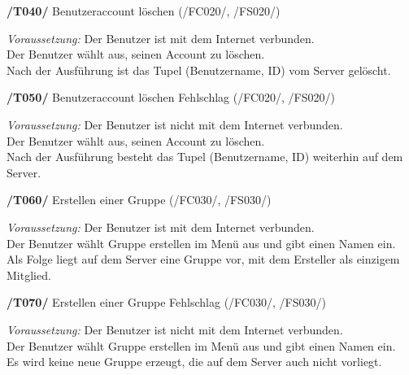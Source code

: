 \textbf{/T040/} Benutzeraccount löschen (/FC020/, /FS020/) \\
\begin{center}
\vspace{-\parskip}
\begin{minipage}[t]{0.9\textwidth}
\emph{Voraussetzung:} Der Benutzer ist mit dem Internet verbunden.               \\
Der Benutzer wählt aus, seinen Account zu löschen.                         \\
Nach der Ausführung ist das Tupel (Benutzername, ID) vom Server gelöscht.   \\
\end{minipage}
\end{center}

\textbf{/T050/} Benutzeraccount löschen Fehlschlag (/FC020/, /FS020/) \\
\begin{center}
\vspace{-\parskip}
\begin{minipage}[t]{0.9\textwidth}
\emph{Voraussetzung:} Der Benutzer ist nicht mit dem Internet verbunden.            \\
Der Benutzer wählt aus, seinen Account zu löschen.                            \\
Nach der Ausführung besteht das Tupel (Benutzername, ID) weiterhin auf dem Server.\\
\end{minipage}
\end{center}

\textbf{/T060/} Erstellen einer Gruppe (/FC030/, /FS030/)\\
\begin{center}
\vspace{-\parskip}
\begin{minipage}[t]{0.9\textwidth}
\emph{Voraussetzung:} Der Benutzer ist mit dem Internet verbunden.                        \\
Der Benutzer wählt Gruppe erstellen im Menü aus und gibt einen Namen ein.           \\
Als Folge liegt auf dem Server eine Gruppe vor, mit dem Ersteller als einzigem Mitglied.\\
\end{minipage}
\end{center}

\textbf{/T070/} Erstellen einer Gruppe Fehlschlag (/FC030/, /FS030/)\\
\begin{center}
\vspace{-\parskip}
\begin{minipage}[t]{0.9\textwidth}
\emph{Voraussetzung:} Der Benutzer ist nicht mit dem Internet verbunden.              \\
Der Benutzer wählt Gruppe erstellen im Menü aus und gibt einen Namen ein.       \\
Es wird keine neue Gruppe erzeugt, die auf dem Server auch nicht vorliegt.       \\
\end{minipage}
\end{center}

